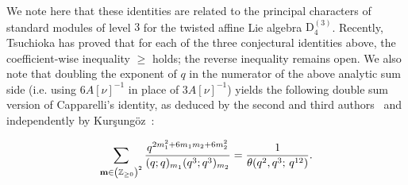 \documentclass[ALCO,Unicode,published]{cedram}
\begin{document}
We note here that these identities are related to the principal characters of standard modules of level $3$ for the twisted affine Lie algebra $\mathrm{D}_4^{(3)}$. 
Recently, Tsuchioka has proved \cite{Tsu-d43level3} that for each of the three conjectural identities above, the coefficient-wise inequality $\geq$ holds; the
reverse inequality remains open.
We also note that doubling the exponent of $q$ in the numerator of the above analytic sum side  (i.e. using $6A[\nu]^{-1}$ in place of $3A[\nu]^{-1}$) yields the following double sum version of Capparelli's identity, as deduced by the second and third authors~\cite{KanRus-stair} and independently by Kur\c{s}ung\"{o}z~\cite{Kur-Cap}:
\begin{thm}
$$
\sum_{{\bf m} \in \left(\mathbb{Z}_{\ge 0}\right)^2} \frac{q^{ 2m_1^2 + 6m_1m_2 + 6m_2^2}}{(q;q)_{m_1}(q^3;q^3)_{m_2}} = 
\frac{1}{\theta(q^2,q^3;\,q^{12})}.
$$
\end{thm}
\end{document}
